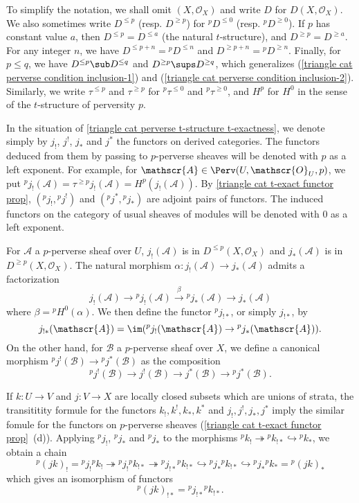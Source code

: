 To simplify the notation, we shall omit $(X,\mathscr{O}_X)$ and write $D$ for $D(X,\mathscr{O}_X)$. We also sometimes write $D^{\leq p}$ (resp. $D^{\geq p}$) for ${^pD^{\leq 0}}$ (resp. ${^pD^{\geq 0}}$). If $p$ has constant value $a$, then $D^{\leq p}=D^{\leq a}$ (the natural $t$-structure), and $D^{\geq p}=D^{\geq a}$. For any integer $n$, we have $D^{\leq p+n}={^pD^{\leq n}}$ and $D^{\geq p+n}={^pD^{\geq n}}$. Finally, for $p\leq q$, we have $D^{\leq p}\sub D^{\leq q}$ and $D^{\geq p}\sups D^{\geq q}$, which generalizes (\ref{triangle cat perverse condition inclusion-1}) and (\ref{triangle cat perverse condition inclusion-2}). Similarly, we write $\tau^{\leq p}$ and $\tau^{\geq p}$ for ${^p\tau^{\leq 0}}$ and ${^p\tau^{\geq 0}}$, and $H^p$ for $H^0$ in the sense of the $t$-structure of perversity $p$.\par
In the situation of \cref{triangle cat perverse t-structure t-exactness}, we denote simply by $j_!$, $j^!$, $j_*$ and $j^*$ the functors on derived categories. The functors deduced from them by passing to $p$-perverse sheaves will be denoted with $p$ as a left exponent. For example, for $\mathscr{A}\in\Perv(U,\mathscr{O}_U,p)$, we put ${^pj_!}(\mathscr{A})=\tau^{\geq p}j_!(\mathscr{A})=H^p(j_!(\mathscr{A}))$. By \cref{triangle cat t-exact functor prop}, $({^pj_!},{^pj^!})$ and $({^pj^*},{^pj_*})$ are adjoint pairs of functors. The induced functors on the category of usual sheaves of modules will be denoted with $0$ as a left exponent.\par
For $\mathscr{A}$ a $p$-perverse sheaf over $U$, $j_!(\mathscr{A})$ is in $D^{\leq p}(X,\mathscr{O}_X)$ and $j_*(\mathscr{A})$ is in $D^{\geq p}(X,\mathscr{O}_X)$. The natural morphism $\alpha:j_!(\mathscr{A})\to j_*(\mathscr{A})$ admits a factorization
\[j_!(\mathscr{A})\to{^pj_!}(\mathscr{A})\stackrel{\beta}{\to}{^pj_*}(\mathscr{A})\to j_*(\mathscr{A})\]
where $\beta={^pH^0}(\alpha)$. We then define the functor ${^pj_{!*}}$, or simply $j_{!*}$, by
\[j_{!*}(\mathscr{A})=\im({^pj_!}(\mathscr{A})\to {^pj_*}(\mathscr{A})).\]
On the other hand, for $\mathscr{B}$ a $p$-perverse sheaf over $X$, we define a canonical morphism ${^pj^!}(\mathscr{B})\to {^pj^*}(\mathscr{B})$ as the composition
\[{^pj^!}(\mathscr{B})\to j^!(\mathscr{B})\to j^*(\mathscr{B})\to {^pj^*}(\mathscr{B}).\]

If $k:U\to V$ and $j:V\to X$ are locally closed subsets which are unions of strata, the transititity formule for the functors $k_!,k^!,k_*,k^*$ and $j_!,j^!,j_*,j^*$ imply the similar fomule for the functors on $p$-perverse sheaves (\cref{triangle cat t-exact functor prop}~(d)). Applying ${^pj_!}$, ${^pj_*}$ and ${^pj_*}$ to the morphisms ${^pk_!}\twoheadrightarrow {^pk_{!*}}\hookrightarrow {^pk_*}$, we obtain a chain
\[{^p(jk)_!}={^pj_!}{^pk_!}\twoheadrightarrow {^pj_!}{^pk_{!*}}\twoheadrightarrow {^pj_{!*}}{^pk_{!*}}\hookrightarrow {^pj_*}{^pk_{!*}}\hookrightarrow {^pj_*}{^pk_*}={^p(jk)_*}\]
which gives an isomorphism of functors
\begin{equation}\label{triangle cat perverse t-structure j_!* transitivity}
{^p(jk)_{!*}}={^pj_{!*}}{^pk_{!*}}.
\end{equation}

